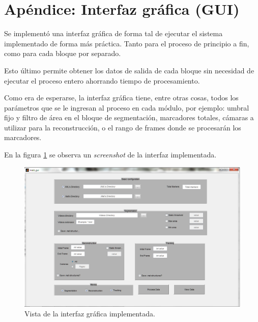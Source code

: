 \section{Apéndice: Interfaz gráfica (GUI)}

Se implementó una interfaz gráfica de forma tal de ejecutar el sistema implementado de forma más práctica. Tanto para el proceso de principio a fin, como para cada bloque por separado.

Esto último permite obtener los datos de salida de cada bloque sin necesidad de ejecutar el proceso entero ahorrando tiempo de procesamiento.

Como era de esperarse, la interfaz gráfica tiene, entre otras cosas, todos los parámetros que se le ingresan al proceso en cada módulo, por ejemplo: umbral fijo y filtro de área en el bloque de segmentación, marcadores totales, cámaras a utilizar para la reconstrucción, o el rango de frames donde se procesarán los marcadores.

En la figura \ref{guiVent} se observa un \emph{screenshot} de la interfaz implementada.

\begin{figure}[H]
\begin{center}
\includegraphics[scale=0.6]{img/gui.png}
\end{center}
\caption{Vista de la interfaz gráfica implementada.}
\label{guiVent}
\end{figure}